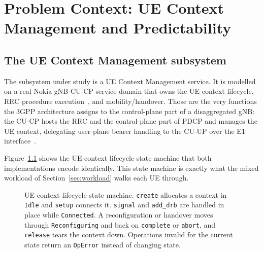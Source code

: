 \documentclass[english,oneside,a4paper,censored,csm,software-track-2020]{HYthesisML}
\begin{document}
\chapter{Problem Context: UE Context Management and Predictability\label{chapter:context}}

\section{The UE Context Management subsystem}
The subsystem under study is a UE Context Management service. It is modelled on a real Nokia
gNB-CU-CP service domain that owns the UE context lifecycle, RRC procedure
execution~\cite{3gpp38331}, and mobility/handover. Those are the very functions the 3GPP
architecture assigns to the control-plane part of a disaggregated gNB: the CU-CP hosts the RRC
and the control-plane part of PDCP and manages the UE context, delegating user-plane bearer
handling to the CU-UP over the E1 interface~\cite{3gpp38401,3gpp38300,3gpp38463}.

Figure~\ref{fig:fsm} shows the UE-context lifecycle state machine that both implementations
encode identically. This state machine is exactly what the mixed workload
of Section~\ref{sec:workload} walks each UE through.

\begin{figure}[ht]
\centering
{}
\caption[UE-context lifecycle state machine]{UE-context lifecycle state machine. \texttt{create} allocates a context in
\texttt{Idle} and \texttt{setup} connects it. \texttt{signal} and \texttt{add\_drb} are handled
in place while \texttt{Connected}. A reconfiguration or handover moves through
\texttt{Reconfiguring} and back on \texttt{complete} or \texttt{abort}, and \texttt{release}
tears the context down. Operations invalid for the current state return an \texttt{OpError}
instead of changing state.\label{fig:fsm}}
\end{figure}
\end{document}
